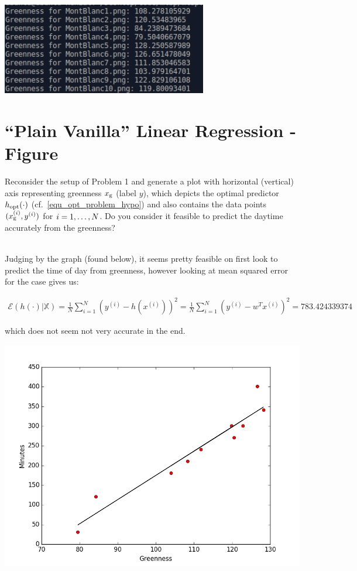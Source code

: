 \documentclass[article,11pt]{article}
\begin{document}
\includegraphics{greenness}

\vspace{3mm}
\newpage
\section{``Plain Vanilla'' Linear Regression - Figure}
\label{problem_1}

Reconsider the setup of Problem 1 and generate a plot with horizontal (vertical) axis representing greenness $x_{\rm g}$ (label $y$), which depicts the optimal predictor 
$h_{\rm opt}(\cdot)$ (cf.\ \eqref{equ_opt_problem_hypo}) and also contains the data points $(x_{\rm g}^{(i)},y^{(i)})$ for $i=1,\ldots,N$. 
Do you consider it feasible to predict the daytime accurately from the greenness?

\vspace{3mm}
\\ Judging by the graph (found below), it seems pretty feasible on first look to predict the time of day from greenness, however looking at mean squared error for the case gives us:

$$
\begin{gathered}
\mathcal {E}(h(\cdot)|\mathbb{X})= \frac{1}{N} \sum_{i=1}^{N} (y^{(i)} - h(x^{(i)}))^2 = \frac{1}{N} \sum_{i=1}^{N} (y^{(i)} - w^T x^{(i)} )^2 = 783.424339374

\end{gathered}
$$

which does not seem not very accurate in the end.

\includegraphics{figure_2}
\vspace{3mm}
\newpage
\end{document}
